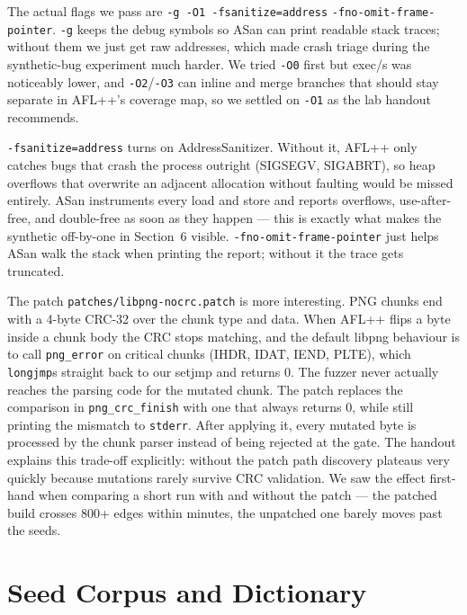 The actual flags we pass are \verb|-g -O1 -fsanitize=address|
\verb|-fno-omit-frame-pointer|. \verb|-g| keeps the debug symbols so
ASan can print readable stack traces; without them we just get raw
addresses, which made crash triage during the synthetic-bug experiment
much harder. We tried \verb|-O0| first but exec/s was noticeably
lower, and \verb|-O2|/\verb|-O3| can inline and merge branches that
should stay separate in AFL++'s coverage map, so we settled on
\verb|-O1| as the lab handout recommends.

\verb|-fsanitize=address| turns on AddressSanitizer. Without it, AFL++
only catches bugs that crash the process outright (SIGSEGV, SIGABRT),
so heap overflows that overwrite an adjacent allocation without
faulting would be missed entirely. ASan instruments every load and
store and reports overflows, use-after-free, and double-free as soon
as they happen — this is exactly what makes the synthetic off-by-one
in Section~6 visible. \verb|-fno-omit-frame-pointer| just helps ASan
walk the stack when printing the report; without it the trace gets
truncated.

The patch \verb|patches/libpng-nocrc.patch| is more interesting. PNG
chunks end with a 4-byte CRC-32 over the chunk type and data. When
AFL++ flips a byte inside a chunk body the CRC stops matching, and
the default libpng behaviour is to call \verb|png_error| on critical
chunks (IHDR, IDAT, IEND, PLTE), which \verb|longjmp|s straight back
to our setjmp and returns 0. The fuzzer never actually reaches the
parsing code for the mutated chunk. The patch replaces the comparison
in \verb|png_crc_finish| with one that always returns 0, while still
printing the mismatch to \verb|stderr|. After applying it, every
mutated byte is processed by the chunk parser instead of being
rejected at the gate. The handout explains this trade-off explicitly:
without the patch path discovery plateaus very quickly because
mutations rarely survive CRC validation. We saw the effect first-hand
when comparing a short run with and without the patch — the patched
build crosses 800+ edges within minutes, the unpatched one barely
moves past the seeds.

\vspace{-10pt}
\section{Seed Corpus and Dictionary}
\vspace{-8pt}
